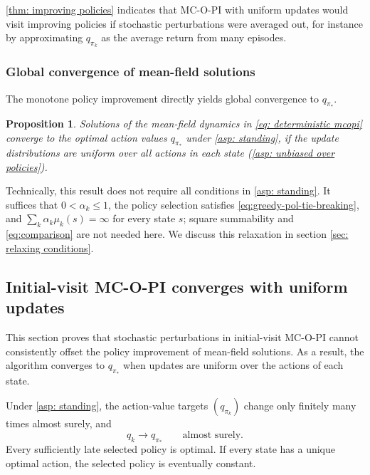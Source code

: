 \documentclass[twoside,11pt]{article}
\newtheorem{proposition}[proposition]{Proposition}
\newcommand{\pol}{\pi}
\newcommand{\qval}{q}
\newcommand{\qopt}{\qval_{\best{\pol}}}
\newcommand{\best}[1]{{#1}_*}
\DeclareRobustCommand{\reviewbarstart}{%
  \ifhmode %
    \vadjust{\vbox to 0pt{%
      \vskip-\ht\strutbox %
      \vskip-\dp\strutbox %
      \cbstart[\changebarwidth] %
      \vss %
    }}%
  \else %
    \cbstart[\changebarwidth]%
  \fi %
} %
\providecommand{\DIFadd}[1]{#1} %
\providecommand{\DIFaddbegin}{\reviewbarstart} %
\providecommand{\DIFaddend}{\protect\cbend} %
\def\DIFadd#1{#1}%
\def\DIFaddbegin{}%
\def\DIFaddend{}%
\begin{document}
\autoref{thm: improving policies} indicates that
MC-O-PI with uniform updates would visit improving policies
if stochastic perturbations were averaged out, for instance by approximating $q_{\pi_k}$ as the average return from many episodes.

 \subsubsection{Global convergence of mean-field solutions}

The monotone policy improvement directly yields global convergence to $\qopt$.

\begin{proposition}
\label{thm: convergence deterministic mcopi}
    Solutions of the mean-field dynamics in \eqref{eq: deterministic mcopi} converge to the optimal action values $\qopt$
    under \autoref{asp: standing},
    if the update distributions are uniform over all actions in each state (\autoref{asp: unbiased over policies}).
\end{proposition}

Technically, this result does not require all conditions in \autoref{asp: standing}. It suffices  \DIFaddbegin \DIFadd{that $0<\alpha_k\le1$, the policy selection satisfies \eqref{eq:greedy-pol-tie-breaking}, and $\sum_k\alpha_k\mu_k(s)=\infty$ for every state $s$; square summability and \eqref{eq:comparison} are not needed here}\DIFaddend . We discuss this relaxation in section \ref{sec: relaxing conditions}.


 \subsection{Initial-visit MC-O-PI converges with uniform updates}
 This section proves that stochastic perturbations in initial-visit MC-O-PI cannot consistently offset the policy improvement of mean-field solutions. As a result, the algorithm converges to $\qopt$ when updates are uniform over the actions of each state.

 \DIFaddbegin \begin{theorem}
\label{thm: convergence mcopi uniform}
\DIFadd{Under \autoref{asp: standing}, the action-value targets $(q_{\pi_k})$ change only finitely many times almost surely, and
}\[
\DIFadd{q_k\longrightarrow q_{\pi_*}\qquad\text{almost surely}.
}\]
\DIFadd{Every sufficiently late selected policy is optimal. If every state has a unique optimal action, the selected policy is eventually constant.
}\end{theorem}
\DIFaddend 
\end{document}
